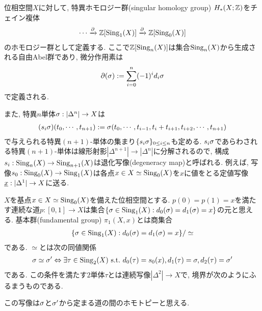 \documentclass[uplatex, a4paper, 14Q, dvipdfmx]{jsreport}
\begin{document}
\begin{example}
  位相空間$X$に対して, 特異ホモロジー群(singular homology group) $H_{\ast}(X;\mathbb{Z})$をチェイン複体
  \begin{align*}
    \cdots \xrightarrow{\partial} \mathbb{Z}[\mathrm{Sing}_1(X)] \xrightarrow{\partial} \mathbb{Z}[\mathrm{Sing}_0(X)]
  \end{align*}
  のホモロジー群として定義する. 
  ここで$\mathbb{Z}[\mathrm{Sing}_n(X)]$は集合$\mathrm{Sing}_n(X)$から生成される自由Abel群であり, 微分作用素は
  \begin{align*}
    \partial(\sigma):= \sum_{i=0}^{n} (-1)^id_i\sigma
  \end{align*}
  で定義される. 

  また, 特異$n$単体$\sigma: |\Delta^n| \to X$は
  \begin{align*}
    (s_i \sigma)(t_0,\cdots,t_{n+1}):= \sigma(t_0,\cdots,t_{i-1},t_i+t_{i+1},t_{i+2},\cdots,t_{n+1})
  \end{align*}
  で与えられる特異$(n+1)$-単体の集まり$\{s_i \sigma\}_{0 \leq i \leq n}$も定める. 
  $s_i \sigma$であらわされる特異$(n+1)$-単体は線形射影$|\Delta^{n+1}| \to |\Delta^n|$に分解されるので, 構成$s_i: \mathrm{Sing}_n(X) \to \mathrm{Sing}_{n+1}(X)$は退化写像(degeneracy map)と呼ばれる. 
  例えば, 写像$s_0: \mathrm{Sing}_0(X) \to \mathrm{Sing}_1(X)$は各点$x \in X \simeq \mathrm{Sing}_0(X)$を$x$に値をとる定値写像$\uline{x}: |\Delta^1| \to X$に送る. 
\end{example}

\begin{example}
  $X$を基点$x \in X \simeq \mathrm{Sing}_0(X)$を備えた位相空間とする. 
  $p(0)=p(1)=x$を満たす連続な道$p: [0,1] \to X$は集合$\{\sigma \in \mathrm{Sing}_1(X): d_0(\sigma)=d_1(\sigma)=x\}$の元と思える. 
  基本群(fundamental group) $\pi_1(X,x)$とは商集合
  \begin{align*}
    \{\sigma \in \mathrm{Sing}_1(X): d_0(\sigma)=d_1(\sigma)=x\}/\simeq
  \end{align*}
  である. 
  $\simeq$とは次の同値関係
  \begin{align*}
    \sigma \simeq \sigma'
    \Leftrightarrow
    \exists \tau \in \mathrm{Sing}_2(X)~ \mathrm{s.t.} ~d_0(\tau)=s_0(x), d_1(\tau)=\sigma, d_2(\tau)=\sigma'
  \end{align*}
  である. 
  この条件を満たす$2$単体$\tau$とは連続写像$|\Delta^2| \to X$で, 境界が次のようにふるまうものである. 
  \begin{center}
  \end{center}
  この写像は$\sigma$と$\sigma'$から定まる道の間のホモトピーと思える. 
\end{example}
\end{document}
